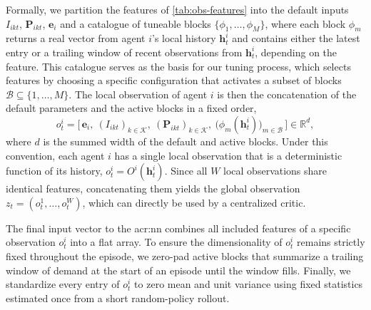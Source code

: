 Formally, we partition the features of \autoref{tab:obs-features} into the default inputs $I_{ikt}$, $\mathbf{P}_{ikt}$, $\mathbf{e}_i$ and a catalogue of tuneable blocks $\{\phi_1, \dots, \phi_M\}$, where each block $\phi_m$ returns a real vector from agent $i$'s local history $\mathbf{h}^i_t$ and contains either the latest entry or a trailing window of recent observations from $\mathbf{h}^i_t$, depending on the feature. This catalogue serves as the basis for our tuning process, which selects features by choosing a specific configuration that activates a subset of blocks $\mathcal{B} \subseteq \{1, \dots, M\}$. The local observation of agent $i$ is then the concatenation of the default parameters and the active blocks in a fixed order, 
\begin{equation}
\label{eq:observation}
 o^i_t = \big[\, \mathbf{e}_i,\ (I_{ikt})_{k \in \mathcal{K}},\ (\mathbf{P}_{ikt})_{k \in \mathcal{K}},\ \big( \phi_m(\mathbf{h}^i_t) \big)_{m \in \mathcal{B}} \,\big] \in \mathbb{R}^{d},
\end{equation}
where $d$ is the summed width of the default and active blocks. Under this convention, each agent $i$ has a single local observation that is a deterministic function of its history, \(o^i_t = O^i(\mathbf{h}^i_t)\). Since all $W$ local observations share identical features, concatenating them yields the global observation $z_t = (o^1_t, \dots, o^W_t)$, which can directly be used by a centralized critic.

The final input vector to the \gls{acr:nn} combines all included features of a specific observation $o_t^i$ into a flat array. To ensure the dimensionality of $o^i_t$ remains strictly fixed throughout the episode, we zero-pad active blocks that summarize a trailing window of demand at the start of an episode until the window fills. Finally, we standardize every entry of $o_t^i$ to zero mean and unit variance using fixed statistics estimated once from a short random-policy rollout.\\

